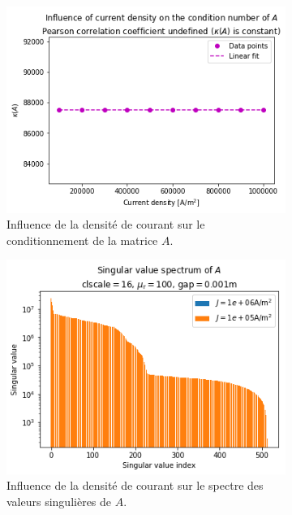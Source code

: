 \documentclass[11pt]{article}
\begin{document}
\begin{figure}[H]
	\begin{subfigure}[t]{0.24\textwidth}
		\centering
		\includegraphics[width=\linewidth]{jcond.png}
		\caption{Influence de la densité de courant sur le conditionnement de la matrice $A$.}
		\label{fig:jcond}
	\end{subfigure}\hfill
	\begin{subfigure}[t]{0.24\textwidth}
		\centering
		\includegraphics[width=\linewidth]{jspec.png}
		\caption{Influence de la densité de courant sur le spectre des valeurs singulières de $A$.}
		\label{fig:jspec}
	\end{subfigure}\hfill
	\begin{subfigure}[t]{0.24\textwidth}
		\centering

\end{subfigure}
\end{figure}
\end{document}
